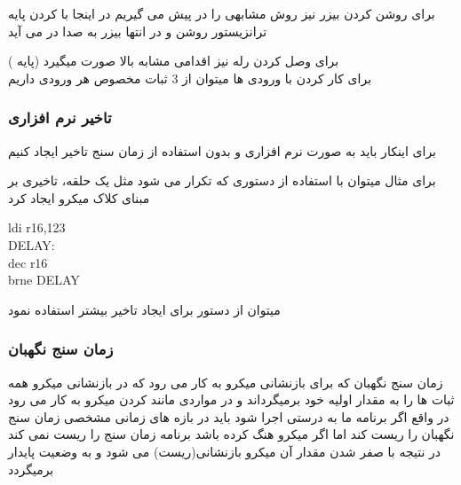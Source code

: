 \documentclass[12pt,a4paper]{article}
\begin{document}
\begin{persian}
		برای روشن کردن بیزر نیز روش مشابهی را در پیش می گیریم در اینجا با  کردن پایه  ترانزیستور روشن و در انتها بیزر به صدا در می آید
		
		برای وصل کردن رله نیز اقدامی مشابه بالا صورت میگیرد (پایه )
		\\
		برای کار کردن با ورودی ها میتوان از 3 ثبات مخصوص هر ورودی
		داریم 
		
	\subsubsection{تاخیر نرم افزاری}
		برای اینکار باید به صورت  نرم افزاری و بدون استفاده از زمان سنج تاخیر ایجاد کنیم
		
		\noindent		
		برای مثال میتوان با استفاده از دستوری که تکرار می شود مثل یک حلقه، تاخیری بر مبنای کلاک میکرو ایجاد کرد
		
		\vspace{10mm}
		\begin{latin}
		\noindent ldi r16,123 \\
		DELAY: \\
		dec r16 \\
		brne DELAY \\
		\end{latin}
	
		میتوان از دستور  برای ایجاد تاخیر بیشتر استفاده نمود
		
	\subsubsection{زمان سنج نگهبان}
		زمان سنج نگهبان  که برای بازنشانی میکرو به کار می رود که در بازنشانی میکرو همه ثبات ها را به مقدار اولیه خود برمیگرداند و در مواردی مانند 
		 کردن میکرو به کار می رود در واقع اگر برنامه ما به درستی اجرا شود باید در بازه های زمانی مشخصی زمان سنج نگهبان را ریست کند اما اگر میکرو هنگ کرده 
		باشد برنامه زمان سنج را ریست نمی کند در نتیجه با صفر شدن مقدار آن میکرو بازنشانی(ریست) می شود و به وضعیت پایدار برمیگردد
		
\end{persian}
\end{document}
